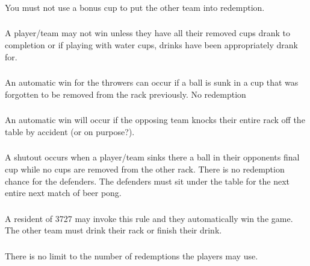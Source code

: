 		\subsubsection{}\label{sssec:Winning,specialshot}
            You must not use a bonus cup to put the other team into redemption.
		\subsubsection{}\label{sssec:Winning,drinking}
			A player/team may not win unless they have all their removed cups drank to completion or if playing with water cups, drinks have been appropriately drank for. 
		\subsubsection{}\label{sssec:Winning,death/killcups}
			An automatic win for the throwers can occur if a ball is sunk in a cup that was forgotten to be removed from the rack previously.
            No redemption
		\subsubsection{}\label{sssec:Winning,knockovers}
			An automatic win will occur if the opposing team knocks their entire rack off the table by accident (or on purpose?).
		\subsubsection{}\label{sssec:Winning,shutout}
			A shutout occurs when a player/team sinks there a ball in their opponents final cup while no cups are removed from the other rack.
            There is no redemption chance for the defenders.
            The defenders must sit under the table for the next entire next match of beer pong.
		\subsubsection{}\label{sssec:ResidentWins}
			A resident of 3727 may invoke this rule and they automatically win the game.
            The other team must drink their rack or finish their drink.
        \subsubsection{}\label{sssec:Winning,no.Redemtions}
            There is no limit to the number of redemptions the players may use.
			
